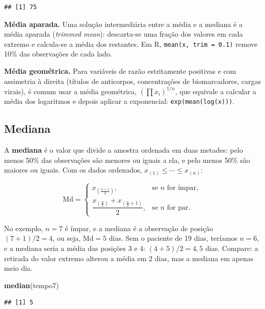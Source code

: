 \documentclass[
]{book}
\newenvironment{Shaded}{\begin{snugshade}}{\end{snugshade}}
\newcommand{\FunctionTok}[1]{\textcolor[rgb]{0.13,0.29,0.53}{\textbf{#1}}}
\newcommand{\NormalTok}[1]{#1}
\begin{document}
\begin{verbatim}
## [1] 75
\end{verbatim}

\textbf{Média aparada.} Uma solução intermediária entre a média e a mediana é a média aparada (\emph{trimmed mean}): descarta-se uma fração dos valores em cada extremo e calcula-se a média dos restantes. Em R, \texttt{mean(x,\ trim\ =\ 0.1)} remove 10\% das observações de cada lado.

\textbf{Média geométrica.} Para variáveis de razão estritamente positivas e com assimetria à direita (títulos de anticorpos, concentrações de biomarcadores, cargas virais), é comum usar a média geométrica, \(\left(\prod x_i\right)^{1/n}\), que equivale a calcular a média dos logaritmos e depois aplicar a exponencial: \texttt{exp(mean(log(x)))}.

\subsection{Mediana}\label{mediana}

A \textbf{mediana} é o valor que divide a amostra ordenada em duas metades: pelo menos 50\% das observações são menores ou iguais a ela, e pelo menos 50\% são maiores ou iguais. Com os dados ordenados, \(x_{(1)} \le \cdots \le x_{(n)}\):

\[
\text{Md} =
\begin{cases}
x_{\left(\frac{n+1}{2}\right)}, & \text{se } n \text{ for ímpar},\\[2mm]
\dfrac{x_{\left(\frac{n}{2}\right)} + x_{\left(\frac{n}{2}+1\right)}}{2}, & \text{se } n \text{ for par}.
\end{cases}
\]

No exemplo, \(n = 7\) é ímpar, e a mediana é a observação de posição \((7+1)/2 = 4\), ou seja, \(\text{Md} = 5\) dias. Sem o paciente de 19 dias, teríamos \(n = 6\), e a mediana seria a média das posições 3 e 4: \((4 + 5)/2 = 4{,}5\) dias. Compare: a retirada do valor extremo alterou a média em 2 dias, mas a mediana em apenas meio dia.

\begin{Shaded}
\begin{Highlighting}[]
\FunctionTok{median}\NormalTok{(tempo7)}
\end{Highlighting}
\end{Shaded}

\begin{verbatim}
## [1] 5
\end{verbatim}
\end{document}
